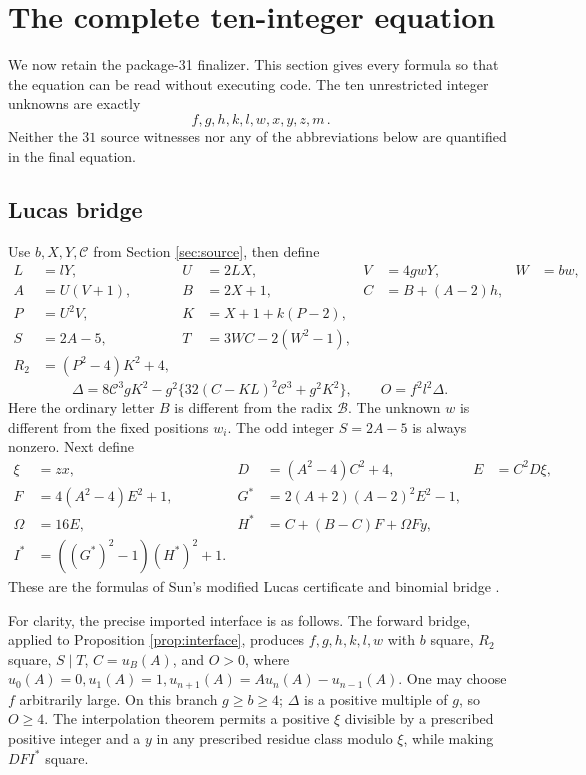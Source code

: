 \documentclass[11pt,a4paper]{article}
\theoremstyle{remark}
\newcommand{\B}{\mathcal B}
\renewcommand{\Cap}{\mathscr C}
\begin{document}
\section{The complete ten-integer equation}\label{sec:final}
We now retain the package-31 finalizer. This section gives every
formula so that the equation can be read without executing code.
The ten unrestricted integer unknowns are exactly
\[
\boxed{\,f,g,h,k,l,w,x,y,z,m\,}.
\]
Neither the \(31\) source witnesses nor any of the abbreviations below
are quantified in the final equation.

\subsection{Lucas bridge}
Use \(b,X,Y,\Cap\) from Section \ref{sec:source}, then define
\begin{align}
L&=lY,&U&=2LX,&V&=4gwY,&W&=bw,\nonumber\\
A&=U(V+1),&B&=2X+1,&C&=B+(A-2)h,\nonumber\\
P&=U^2V,&K&=X+1+k(P-2),\label{eq:bridge}\\
S&=2A-5,&T&=3WC-2(W^2-1),\nonumber\\
R_2&=(P^2-4)K^2+4,\nonumber
\end{align}
\[
\Delta=8\Cap^3gK^2-g^2\{32(C-KL)^2\Cap^3+g^2K^2\},
\qquad O=f^2l^2\Delta.
\]
Here the ordinary letter \(B\) is different from the radix \(\B\).
The unknown \(w\) is different from the fixed positions \(w_i\).
The odd integer \(S=2A-5\) is always nonzero.
Next define
\begin{align}
\xi&=zx,&D&=(A^2-4)C^2+4,&E&=C^2D\xi,\nonumber\\
F&=4(A^2-4)E^2+1,&
G^*&=2(A+2)(A-2)^2E^2-1,\label{eq:lucas}\\
\Omega&=16E,&H^*&=C+(B-C)F+\Omega Fy,\nonumber\\
I^*&=((G^*)^2-1)(H^*)^2+1.\nonumber
\end{align}
These are the formulas of Sun's modified Lucas certificate and
binomial bridge \cite[Theorems 3.1 and 4.1; Propositions 6.1 and
6.2]{sun2026}.

For clarity, the precise imported interface is as follows.
The forward bridge, applied to Proposition \ref{prop:interface},
produces \(f,g,h,k,l,w\) with \(b\) square, \(R_2\) square,
\(S\mid T\), \(C=u_B(A)\), and \(O>0\), where
\(u_0(A)=0,u_1(A)=1,u_{n+1}(A)=Au_n(A)-u_{n-1}(A)\).
One may choose \(f\) arbitrarily large. On this branch \(g\ge b\ge4\);
\(\Delta\) is a positive multiple of \(g\), so \(O\ge4\).
The interpolation theorem permits a positive \(\xi\) divisible by a
prescribed positive integer and a \(y\) in any prescribed residue
class modulo \(\xi\), while making \(DFI^*\) square.
\end{document}
